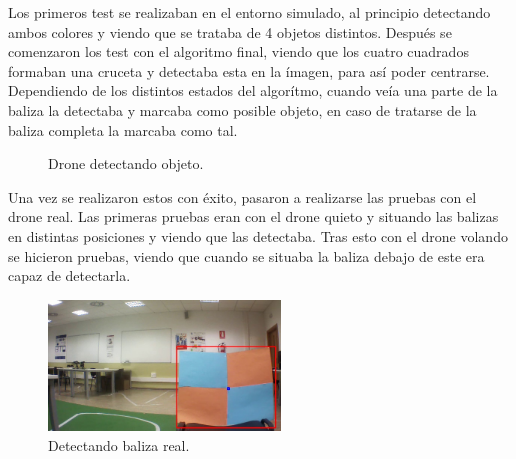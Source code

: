 \hspace{1cm} Los primeros test se realizaban en el entorno simulado, al principio detectando ambos colores y viendo que se trataba de 4 objetos distintos. Despu\'es se comenzaron los test con el algoritmo final, viendo que los cuatro cuadrados formaban una cruceta y detectaba esta en la \'imagen, para as\'i poder centrarse. Dependiendo de los distintos estados del algor\'itmo, cuando ve\'ia una parte de la baliza la detectaba y marcaba como posible objeto, en caso de tratarse de la baliza completa la marcaba como tal. 

\begin{figure}[H]
 \centering
 \caption{Drone detectando objeto.}
 \label{f:Drone detecta objeto. }
\end{figure} 

\hspace{1cm} Una vez se realizaron estos con \'exito, pasaron a realizarse las pruebas con el drone real. Las primeras pruebas eran con el drone quieto y situando las balizas en distintas posiciones y viendo que las detectaba. Tras esto con el drone volando se hicieron pruebas, viendo que cuando se situaba la baliza debajo de este era capaz de detectarla. 

\begin{figure}[H]
	\centering
		\includegraphics[width=0.55\textwidth]{imgs/k_beacon21.jpg}
		\caption{Detectando baliza real.}
	\label{fig:Detectando baliza real.}
\end{figure}

